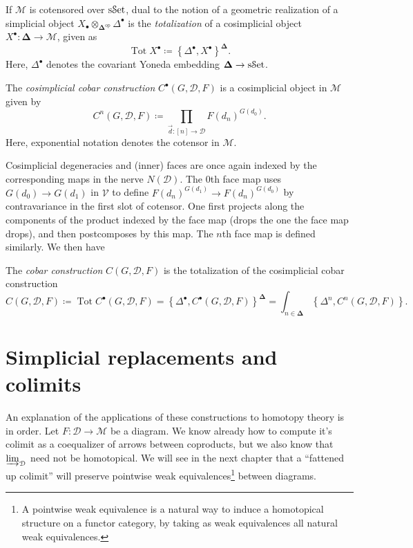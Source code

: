 If $\mathcal{M} $ is cotensored over $\mathrm{s}\mathcal{S}\mathrm{et}$, dual to the notion of a geometric realization of a simplicial object $ X_{\bullet} \otimes_{\boldsymbol{\Delta^{\mathrm{op}} }}\Delta^{\bullet} $ is the \emph{totalization} of a cosimplicial object $X^{\bullet} : \boldsymbol{\Delta}  \to \mathcal{M} $, given as
\[
	\operatorname{Tot} X^{\bullet} \coloneqq \left\{ \Delta^{\bullet} ,X^{\bullet}  \right\}^{\boldsymbol{\Delta} }
.\]
Here, $\Delta^{\bullet} $ denotes the covariant Yoneda embedding $\boldsymbol{\Delta} \to \mathrm{s}\mathcal{S}\mathrm{et}$.

\begin{definition}\label{dfn:4.4}
	The \emph{cosimplicial cobar construction} $C^{\bullet} (G,\mathcal{D} ,F)$ is a cosimplicial object in $\mathcal{M} $ given by
	\[
		C^n(G,\mathcal{D} ,F)\coloneqq \prod_{\vec{d} : [n] \to \mathcal{D} } F(d_n)^{G(d_0)} 
	.\]
	Here, exponential notation denotes the cotensor in $\mathcal{M} $.
\end{definition}

Cosimplicial degeneracies and (inner) faces are once again indexed by the corresponding maps in the nerve $N(\mathcal{D} )$. The 0th face map uses $G(d_0)\to G(d_1)$ in $\mathcal{V} $ to define $F(d_n)^{G(d_1)} \to F(d_n)^{G(d_0)} $ by contravariance in the first slot of cotensor. One first projects along the components of the product indexed by the face map (drops the one the face map drops), and then postcomposes by this map. The $n$th face map is defined similarly. We then have

\begin{definition}[Cobar]\label{dfn:4.5}
	The \emph{cobar construction} $C(G,\mathcal{D} ,F)$ is the totalization of the cosimplicial cobar construction
	\[
		C(G,\mathcal{D} ,F)\coloneqq \operatorname{Tot} C^{\bullet} (G,\mathcal{D} ,F)=\left\{ \Delta^{\bullet} ,C^{\bullet} (G,\mathcal{D} ,F) \right\} ^{\boldsymbol{\Delta} } =\int_{n\in\boldsymbol{\Delta} } \left\{ \Delta^n,C^n(G,\mathcal{D} ,F) \right\} 
	.\]
\end{definition}

\section{Simplicial replacements and colimits}

An explanation of the applications of these constructions to homotopy theory is in order. Let $F : \mathcal{D}  \to \mathcal{M} $ be a diagram. We know already how to compute it's colimit as a coequalizer of arrows between coproducts, but we also know that $\varinjlim _\mathcal{D} $ need not be homotopical. We will see in the next chapter that a ``fattened up colimit'' will preserve pointwise weak equivalences\footnote{A pointwise weak equivalence is a natural way to induce a homotopical structure on a functor category, by taking as weak equivalences all natural weak equivalences.} between diagrams.

